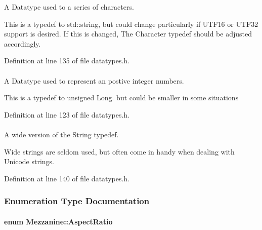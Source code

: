 A Datatype used to a series of characters. 

This is a typedef to std::string, but could change particularly if UTF16 or UTF32 support is desired. If this is changed, The Character typedef should be adjusted accordingly. 

Definition at line 135 of file datatypes.h.

\hypertarget{namespaceMezzanine_adcbb6ce6d1eb4379d109e51171e2e493}{
\paragraph[{Whole}]{}\hfill}
\label{namespaceMezzanine_adcbb6ce6d1eb4379d109e51171e2e493}


A Datatype used to represent an postive integer numbers. 

This is a typedef to unsigned Long. but could be smaller in some situations 

Definition at line 123 of file datatypes.h.

\hypertarget{namespaceMezzanine_a08b3adb0d2632e4f6a454fdf3cf5efda}{
\paragraph[{WideString}]{}\hfill}
\label{namespaceMezzanine_a08b3adb0d2632e4f6a454fdf3cf5efda}


A wide version of the String typedef. 

Wide strings are seldom used, but often come in handy when dealing with Unicode strings. 

Definition at line 140 of file datatypes.h.



\subsubsection{Enumeration Type Documentation}
\hypertarget{namespaceMezzanine_a4f14cccd98d1bdc1bf934c1c028e3eaf}{
\paragraph[{AspectRatio}]{\setlength{\rightskip}{0pt plus 5cm}enum {\bf Mezzanine::AspectRatio}}\hfill}
\label{namespaceMezzanine_a4f14cccd98d1bdc1bf934c1c028e3eaf}


